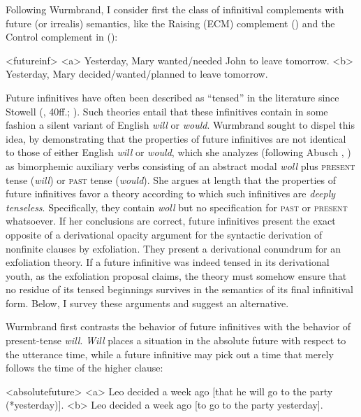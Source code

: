 \documentclass[output=paper]{langscibook}
\begin{document}
Following Wurmbrand, I consider first the class of infinitival complements with future (or irrealis) semantics, like the Raising (ECM) complement () and the Control complement in ():

\pex<futureinf>
\a<a> Yesterday, Mary wanted/needed John to leave tomorrow.
\a<b> Yesterday, Mary decided/wanted/planned to leave tomorrow.
\xe

\noindent Future infinitives have often been described as “tensed” in the literature since Stowell (\citeyear{Stowell:1981}, 40ff.; \citeyear{Stowell1982b}). Such theories entail that these infinitives contain in some fashion a silent variant of English \textit{will} or \textit{would}. Wurmbrand sought to dispel this idea, by demonstrating that the properties of future infinitives are not identical to those of either English \textit{will} or \textit{would}, which she analyzes (following Abusch \citeyear{Abusch:1985tm}, \citeyear{Abusch1988}) as bimorphemic auxiliary verbs consisting of an abstract modal \textit{woll} plus \textsc{present} tense (\textit{will}) or \textsc{past} tense (\textit{would}). She argues at length that the properties of future infinitives favor a theory according to which such infinitives are \textit{deeply tenseless}. Specifically, they contain \textit{woll} but no specification for \textsc{past} or \textsc{present} whatsoever. If her conclusions are correct, future infinitives present the exact opposite of a derivational opacity argument for the syntactic derivation of nonfinite clauses by exfoliation. They present a derivational conundrum for an exfoliation theory. If a future infinitive was indeed tensed in its derivational youth, as the exfoliation proposal claims, the theory must somehow ensure that no residue of its tensed beginnings survives in the semantics of its final infinitival form. Below, I survey these arguments and suggest an alternative.

Wurmbrand first contrasts the behavior of future infinitives with the behavior of present-tense \textit{will}. \textit{Will} places a situation in the absolute future with respect to the utterance time, while a future infinitive may pick out a time that merely follows the time of the higher clause: 

\pex<absolutefuture>
\a<a> Leo decided a week ago [that he will go to the party (*yesterday)].
\a<b> Leo decided a week ago [to go to the party yesterday].
\xe
\end{document}
